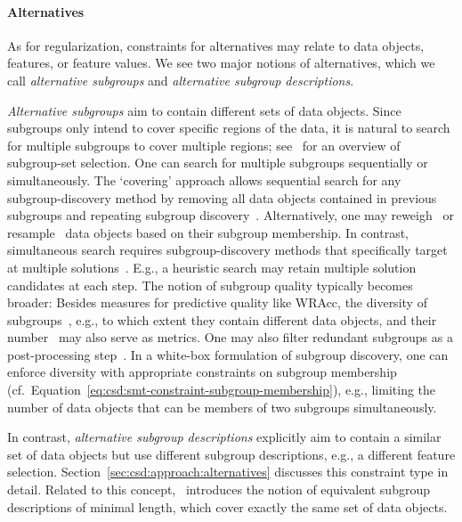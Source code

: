 \documentclass{article}
\theoremstyle{definition}
\begin{document}
\paragraph{Alternatives}

As for regularization, constraints for alternatives may relate to data objects, features, or feature values.
We see two major notions of alternatives, which we call \emph{alternative subgroups} and \emph{alternative subgroup descriptions}.

\emph{Alternative subgroups} aim to contain different sets of data objects.
Since subgroups only intend to cover specific regions of the data, it is natural to search for multiple subgroups to cover multiple regions; see~\cite{atzmueller2015subgroup} for an overview of subgroup-set selection.
One can search for multiple subgroups sequentially or simultaneously.
The `covering' approach allows sequential search for any subgroup-discovery method by removing all data objects contained in previous subgroups and repeating subgroup discovery~\cite{friedman1999bump}.
Alternatively, one may reweigh~\cite{gamberger2002expert, lavrac2004subgroup} or resample~\cite{scholz2005sampling} data objects based on their subgroup membership.
In contrast, simultaneous search requires subgroup-discovery methods that specifically target at multiple solutions~\cite{leeuwen2012diverse, leeuwen2013discovering, lemmerich2010fast, lucas2018ssdp+, proencca2022robust}.
E.g., a heuristic search may retain multiple solution candidates at each step.
The notion of subgroup quality typically becomes broader:
Besides measures for predictive quality like WRAcc, the diversity of subgroups~\cite{belfodil2019fssd, leeuwen2012diverse, leeuwen2013discovering, lucas2018ssdp+}, e.g., to which extent they contain different data objects, and their number~\cite{helal2016subgroup, herrera2011overview, ventura2018subgroup} may also serve as metrics.
One may also filter redundant subgroups as a post-processing step~\cite{bosc2018anytime, grosskreutz2012enhanced, hudson2023subgroup, leeuwen2013discovering}.
In a white-box formulation of subgroup discovery, one can enforce diversity with appropriate constraints on subgroup membership (cf.~Equation~\ref{eq:csd:smt-constraint-subgroup-membership}), e.g., limiting the number of data objects that can be members of two subgroups simultaneously.

In contrast, \emph{alternative subgroup descriptions} explicitly aim to contain a similar set of data objects but use different subgroup descriptions, e.g., a different feature selection.
Section~\ref{sec:csd:approach:alternatives} discusses this constraint type in detail.
Related to this concept, \cite{boley2009non}~introduces the notion of equivalent subgroup descriptions of minimal length, which cover exactly the same set of data objects.
\end{document}
